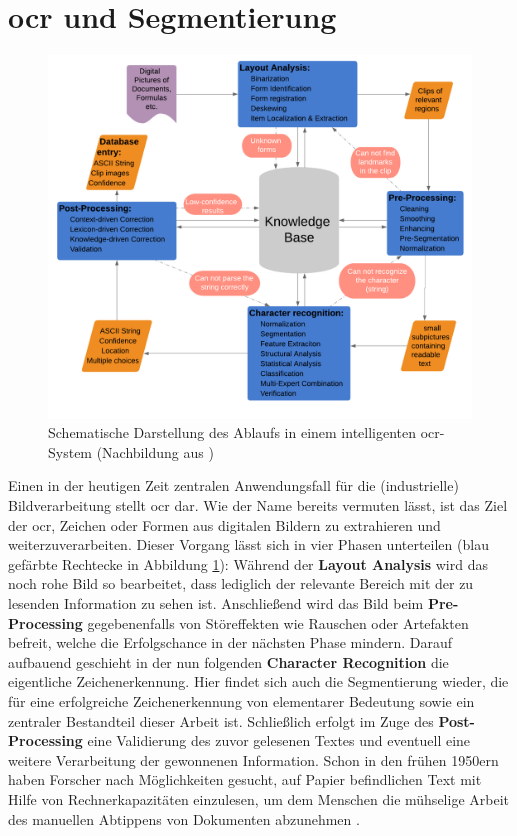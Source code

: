 	\section{\gls{ocr} und Segmentierung}
		\begin{figure}[H]
			\centering
			\includegraphics[width=\linewidth]{Ablauf-OCR_Cheriet-et-al.pdf}
			\caption[typisches \gls{ocr}-Ablaufschema]{Schematische Darstellung des 
				Ablaufs in einem intelligenten \gls{ocr}-System (Nachbildung aus 
				\cite[Seite 7]{cher-et-al-ocr})}
			\label{fig:ocr-system}
		\end{figure}
		
		Einen in der heutigen Zeit zentralen Anwendungsfall für die (industrielle) Bildverarbeitung stellt \gls{ocr} dar. Wie der Name bereits vermuten lässt, ist das Ziel der \gls{ocr}, Zeichen oder Formen aus digitalen Bildern zu extrahieren und weiterzuverarbeiten. Dieser Vorgang lässt sich in vier Phasen unterteilen (blau gefärbte Rechtecke in Abbildung \ref{fig:ocr-system}): Während der \textbf{Layout Analysis} wird das noch rohe Bild so bearbeitet, dass lediglich der relevante Bereich mit der zu lesenden Information zu sehen ist. Anschließend wird das Bild beim \textbf{Pre-Processing} gegebenenfalls von Störeffekten wie Rauschen oder Artefakten befreit, welche die Erfolgschance in der nächsten Phase mindern. Darauf aufbauend geschieht in der nun folgenden \textbf{Character Recognition} die eigentliche Zeichenerkennung. Hier findet sich auch die Segmentierung wieder, die für eine erfolgreiche Zeichenerkennung von elementarer Bedeutung sowie ein zentraler Bestandteil dieser Arbeit ist. Schließlich erfolgt im Zuge des \textbf{Post-Processing} eine Validierung des zuvor gelesenen Textes und eventuell eine weitere Verarbeitung der gewonnenen Information. Schon in den frühen 1950ern haben Forscher nach Möglichkeiten gesucht, auf Papier befindlichen Text mit Hilfe von Rechnerkapazitäten einzulesen, um dem Menschen die mühselige Arbeit des manuellen Abtippens von Dokumenten abzunehmen \cite{cher-et-al-ocr}.\\
		
